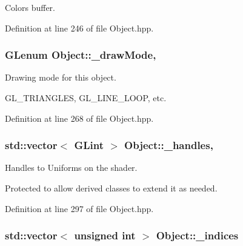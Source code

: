 Colors buffer. 



Definition at line 246 of file Object.\-hpp.

\hypertarget{class_object_ae8457eabfb89d55826142508013b56c0}{
\subsubsection[{\-\_\-draw\-Mode}]{\setlength{\rightskip}{0pt plus 5cm}G\-Lenum Object\-::\-\_\-draw\-Mode\hspace{0.3cm}{\ttfamily [protected]}, {\ttfamily [inherited]}}}\label{class_object_ae8457eabfb89d55826142508013b56c0}


Drawing mode for this object. 

G\-L\-\_\-\-T\-R\-I\-A\-N\-G\-L\-E\-S, G\-L\-\_\-\-L\-I\-N\-E\-\_\-\-L\-O\-O\-P, etc. 

Definition at line 268 of file Object.\-hpp.

\hypertarget{class_object_a983963f564898beca4bda99676245663}{
\subsubsection[{\-\_\-handles}]{\setlength{\rightskip}{0pt plus 5cm}std\-::vector$<$ G\-Lint $>$ Object\-::\-\_\-handles\hspace{0.3cm}{\ttfamily [protected]}, {\ttfamily [inherited]}}}\label{class_object_a983963f564898beca4bda99676245663}


Handles to Uniforms on the shader. 

Protected to allow derived classes to extend it as needed. 

Definition at line 297 of file Object.\-hpp.

\hypertarget{class_object_ab85adc7a2d3b891051c096593982653d}{
\subsubsection[{\-\_\-indices}]{\setlength{\rightskip}{0pt plus 5cm}std\-::vector$<$ unsigned int $>$ Object\-::\-\_\-indices\hspace{0.3cm}{\ttfamily [inherited]}}}\label{class_object_ab85adc7a2d3b891051c096593982653d}


